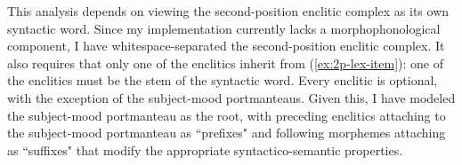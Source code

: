 \begin{comment}
My analysis for this is the same as that for focus fronting, minus the addition of focused information. I create a similar rule that behaves in the same way, \textit{non-focus-filler-head-rule}. Where the \textit{focus-filler-head-rule} adds focus information to its non-head-daughter, the \textit{non-focus-filler-head-rule} does not, and requires that its non-head-daughter be [\textsc{head} \textit{quantifier}]. Similarly, I add the constraint to \textit{focus-filler-head-rule} that its non-head-daughter be [\textsc{head} \textit{non-quantifier}].

I assert that the clitics are the syntactic heads of the clause. This analysis requires argument composition, or a word (in this case, the syntactic word of the second-position enclitic complex) taking on the arguments of its complement (here, the sentential predicate), an analysis first developed in \citet{millersag1997}. The way I model this in my implementation is by the subject-mood clitics taking their complement's valence properties and making it their own. That is, the generic type for the second-position clitics is:

\ex \label{ex:2pavm}
\begin{avm}
\[\asort{clausal-inflection}
  \textsc{head.pred} & + \\
  \textsc{subj} & \avmbox{1} \\
  \textsc{comp} & \< \[\textsc{head.pred} & $+$ \\
                       \textsc{subj} & \avmbox{1} \\
                       \textsc{comp} & \avmbox{2} \] \>\ $\oplus$ \avmbox{2}
 \]
\end{avm}
\xe

\end{comment}


This analysis depends on viewing the second-position enclitic complex as its own syntactic word. Since my implementation currently lacks a morphophonological component, I have whitespace-separated the second-position enclitic complex. It also requires that only one of the enclitics inherit from (\ref{ex:2p-lex-item}): one of the enclitics must be the stem of the syntactic word. Every enclitic is optional, with the exception of the subject-mood portmanteaus. Given this, I have modeled the subject-mood portmanteau as the root, with preceding enclitics attaching to the subject-mood portmanteau as ``prefixes" and following morphemes attaching as ``suffixes" that modify the appropriate syntactico-semantic properties.

